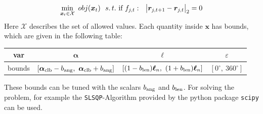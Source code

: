 \documentclass[10pt,a4paper]{article}
\begin{document}
\begin{equation}
\min_{\bm{x}_t \in \mathcal{X}} ~ obj(\bm{x}_t)~~ s.\,t.~ \textnormal{if}~f_{j,t}:~~\big|\bm{r}_{j,t+1} - \bm{r}_{j,t}\big|_2 = 0
\end{equation}
Here  $\mathcal{X}$ describes the set of allowed values.
Each quantity inside $\bm{x}$ has bounds, which are given in the following table:

\begin{center}
\begin{tabular}{c|c|c|c}
var & $\bm{\alpha}$ & $\bm{\ell}$ & $\varepsilon$ \\ 
\hline
bounds & $\left[ \bm{\alpha_{\textnormal{clb}}}-b_{\textnormal{ang}},~\bm{\alpha_{\textnormal{clb}}}+b_{\textnormal{ang}} \right]$ &
$\left[ (1-b_\textnormal{len})\bm{\ell}_n,~(1+b_\textnormal{len})\bm{\ell}_n \right]$ &
$\left[ 0^\circ,~ 360^\circ \right]$
\end{tabular}
\end{center}
These bounds can be tuned with the scalars $b_{\textnormal{ang}}$ and $b_{\textnormal{len}}$.
For solving the problem, for example the \texttt{SLSQP}-Algorithm provided by the python package \texttt{scipy} can be used.
\end{document}
